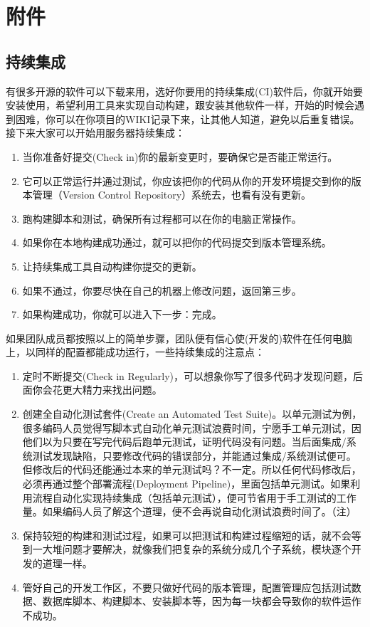 \hypertarget{ux9644ux4ef6}{%
\section{附件}\label{ux9644ux4ef6}}

\hypertarget{ux6301ux7eedux96c6ux6210-1}{%
\subsection{持续集成}\label{ux6301ux7eedux96c6ux6210-1}}

有很多开源的软件可以下载来用，选好你要用的持续集成(CI)软件后，你就开始要安装使用，希望利用工具来实现自动构建，跟安装其他软件一样，开始的时候会遇到困难，你可以在你项目的WIKI记录下来，让其他人知道，避免以后重复错误。接下来大家可以开始用服务器持续集成：

\begin{enumerate}
\tightlist
\item
  当你准备好提交(Check in)你的最新变更时，要确保它是否能正常运行。
\item
  它可以正常运行并通过测试，你应该把你的代码从你的开发环境提交到你的版本管理（Version
  Control Repository）系统去，也看有没有更新。
\item
  跑构建脚本和测试，确保所有过程都可以在你的电脑正常操作。
\item
  如果你在本地构建成功通过，就可以把你的代码提交到版本管理系统。
\item
  让持续集成工具自动构建你提交的更新。
\item
  如果不通过，你要尽快在自己的机器上修改问题，返回第三步。
\item
  如果构建成功，你就可以进入下一步：完成。
\end{enumerate}

如果团队成员都按照以上的简单步骤，团队便有信心使(开发的)软件在任何电脑上，以同样的配置都能成功运行，一些持续集成的注意点：

\begin{enumerate}
\tightlist
\item
  定时不断提交(Check in
  Regularly)，可以想象你写了很多代码才发现问题，后面你会花更大精力来找出问题。
\item
  创建全自动化测试套件(Create an Automated Test
  Suite)。以单元测试为例，很多编码人员觉得写脚本式自动化单元测试浪费时间，宁愿手工单元测试，因他们以为只要在写完代码后跑单元测试，证明代码没有问题。当后面集成/系统测试发现缺陷，只要修改代码的错误部分，并能通过集成/系统测试便可。但修改后的代码还能通过本来的单元测试吗？不一定。所以任何代码修改后，必须再通过整个部署流程(Deployment
  Pipeline)，里面包括单元测试。如果利用流程自动化实现持续集成（包括单元测试），便可节省用于手工测试的工作量。如果编码人员了解这个道理，便不会再说自动化测试浪费时间了。（注）
\item
  保持较短的构建和测试过程，如果可以把测试和构建过程缩短的话，就不会等到一大堆问题才要解决，就像我们把复杂的系统分成几个子系统，模块逐个开发的道理一样。
\item
  管好自己的开发工作区，不要只做好代码的版本管理，配置管理应包括测试数据、数据库脚本、构建脚本、安装脚本等，因为每一块都会导致你的软件运作不成功。
\end{enumerate}


